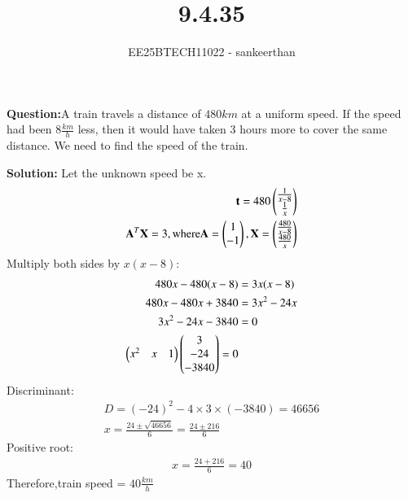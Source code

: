 \documentclass[journal]{IEEEtran}
\begin{document}


\title{9.4.35}
\author{EE25BTECH11022 - sankeerthan}
{\let\newpage\relax\maketitle}

\renewcommand{\thefigure}{\theenumi}
\renewcommand{\thetable}{\theenumi}
\setlength{\intextsep}{10pt} %


\renewcommand{\thetable}{\theenumi}

\textbf{Question:}A train travels a distance of $480km$ at a uniform speed. If the speed had been 8$\frac{km}{h}$ less, then it would have taken 3 hours more to cover the same distance. We need to find the speed of the train.

\textbf{Solution:}
Let the unknown speed be x.
\begin{align}
\mathbf{t} =480\begin{pmatrix}\frac{1}{x-8} \\\frac{1}{x}\end{pmatrix} \\
\mathbf{A}^T\mathbf{X} =3,\text{where}\mathbf{A} =\begin{pmatrix}1 \\ -1\end{pmatrix},
\mathbf{X} =\begin{pmatrix}\frac{480}{x-8} \\\frac{480}{x}\end{pmatrix}
\end{align}
Multiply both sides by $x(x-8)$:
\begin{align}
480x-480(x-8)&=3x(x-8) \\
480x-480x+3840 &=3x^2-24x \\
3x^2-24x-3840 &=0 \\
\begin{pmatrix}x^2 & x & 1\end{pmatrix}\begin{pmatrix}3 \\ -24\\ -3840\end{pmatrix} =0
\end{align}
Discriminant:
\begin{align}
D = (-24)^2 - 4 \times 3 \times (-3840) = 46656 \\
x = \frac{24 \pm \sqrt{46656}}{6} = \frac{24 \pm 216}{6}
\end{align}
Positive root:
\begin{align}
x = \frac{24 + 216}{6} = 40
\end{align}
Therefore,train speed = $40\frac{km}{h}$
\end{document}
